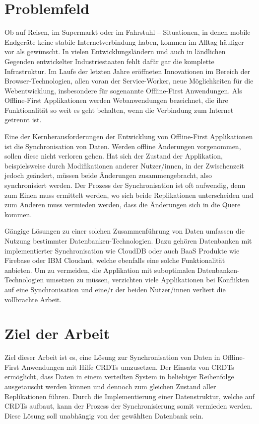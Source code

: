 \documentclass[a4paper, 12pt]{scrreprt}
\begin{document}
\section{Problemfeld}\label{sec:Problemfeld}

Ob auf Reisen, im Supermarkt oder im Fahrstuhl -- Situationen, in denen mobile Endgeräte keine stabile Internetverbindung haben, kommen im Alltag häufiger vor als gewünscht. In vielen Entwicklungsländern und auch in ländlichen Gegenden entwickelter Industriestaaten fehlt dafür gar die komplette Infrastruktur. Im Laufe der letzten Jahre eröffneten Innovationen im Bereich der Browser-Technologien, allen voran der Service-Worker, neue Möglichkeiten für die Webentwicklung, insbesondere für sogenannte Offline-First Anwendungen. Als Offline-First Applikationen werden Webanwendungen bezeichnet, die ihre Funktionalität so weit es geht behalten, wenn die Verbindung zum Internet getrennt ist.

Eine der Kernherausforderungen der Entwicklung von Offline-First Applikationen ist die Synchronisation von Daten. Werden offline Änderungen vorgenommen, sollen diese nicht verloren gehen. Hat sich der Zustand der Applikation, beispielsweise durch Modifikationen anderer Nutzer/innen, in der Zwischenzeit jedoch geändert, müssen beide Änderungen zusammengebracht, also synchronisiert werden. Der Prozess der Synchronisation ist oft aufwendig, denn zum Einen muss ermittelt werden, wo sich beide Replikationen unterscheiden und zum Anderen muss vermieden werden, dass die Änderungen sich in die Quere kommen. 

Gängige Lösungen zu einer solchen Zusammenführung von Daten umfassen die Nutzung bestimmter Datenbanken-Technologien. Dazu gehören Datenbanken mit implementierter Synchronisation wie CloudDB oder auch \ac{BaaS} Produkte wie Firebase oder IBM Cloudant, welche ebenfalls eine solche Funktionalität anbieten. Um zu vermeiden, die Applikation mit suboptimalen Datenbanken-Technologien umsetzen zu müssen, verzichten viele Applikationen bei Konflikten auf eine Synchronisation und eine/r der beiden Nutzer/innen verliert die vollbrachte Arbeit.

\section{Ziel der Arbeit} 
\label{zieleDerArbeit}
Ziel dieser Arbeit ist es, eine Lösung zur Synchronisation von Daten in Offline-First Anwendungen mit Hilfe \acp{CRDT} umzusetzen. Der Einsatz von \acp{CRDT} ermöglicht, dass Daten in einem verteilten System in beliebiger Reihenfolge ausgetauscht werden können und dennoch zum gleichen Zustand aller Replikationen führen. Durch die Implementierung einer Datenstruktur, welche auf \acp{CRDT} aufbaut, kann der Prozess der Synchronisierung somit vermieden werden. Diese Lösung soll unabhängig von der gewählten Datenbank sein.
\end{document}
